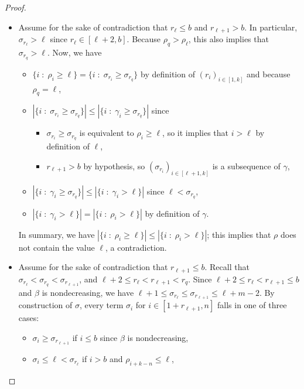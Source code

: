 \documentclass[a4paper,11pt]{article}
\theoremstyle{definition}
\theoremstyle{remark}
\begin{document}
\begin{proof}
    \begin{itemize}
        \item Assume for the sake of contradiction that $r_\ell \leq b$ and $r_{\ell+1} > b$. In particular, $\sigma_{r_{\ell}} > \ell$ since $r_\ell \in [\ell+2, b]$. Because $\rho_q > \rho_\ell$, this also implies that $\sigma_{r_q} > \ell$. Now, we have
        \begin{itemize}
            \item $\{i \; : \; \rho_i \geq \ell \} = \{i \; : \; \sigma_{r_i} \geq \sigma_{r_q}\}$ by definition of $(r_i)_{i \in [1,k]}$ and because $\rho_q = \ell$,
            \item $|\{i \; : \; \sigma_{r_i} \geq \sigma_{r_q}\}| \leq |\{i \; : \; \gamma_i \geq \sigma_{r_q}\}|$ since 
            \begin{itemize}
                \item $\sigma_{r_i} \geq \sigma_{r_q}$ is equivalent to $\rho_i \geq \ell$, so it implies that $i > \ell$ by definition of $\ell$,
                \item $r_{\ell+1} > b$ by hypothesis, so $(\sigma_{r_i})_{i \in [\ell+1,k]}$ is a subsequence of $\gamma$,
            \end{itemize}
            \item $|\{i \; : \; \gamma_i \geq \sigma_{r_q}\}| \leq |\{i \; : \; \gamma_i > \ell\}|$ since $\ell < \sigma_{r_q}$,
            \item $|\{i \; : \; \gamma_i > \ell\}| = |\{i \; : \; \rho_i > \ell\}|$ by definition of $\gamma$.
        \end{itemize}
        In summary, we have $|\{i \; : \; \rho_i \geq \ell \}| \leq |\{i \; : \; \rho_i > \ell\}|$; this implies that $\rho$ does not contain the value $\ell$, a contradiction.
        \item Assume for the sake of contradiction that $r_{\ell+1} \leq b$. Recall that $\sigma_{r_\ell} < \sigma_{r_q} < \sigma_{r_{\ell+1}}$, and $\ell + 2 \leq r_\ell < r_{\ell+1} < r_q$. Since $\ell+2 \leq r_\ell < r_{\ell+1} \leq b$ and $\beta$ is nondecreasing, we have $\ell+1 \leq \sigma_{r_\ell} \leq \sigma_{r_{\ell+1}} \leq \ell + m - 2$. By construction of $\sigma$, every term $\sigma_i$ for $i \in [1+r_{\ell+1}, n]$ falls in one of three cases:
        \begin{itemize}
            \item $\sigma_i \geq \sigma_{r_{\ell+1}}$ if $i \leq b$ since $\beta$ is nondecreasing,
            \item $\sigma_i \leq \ell < \sigma_{r_\ell}$ if $i > b$ and $\rho_{i+k-n} \leq \ell$,

\end{itemize}
\end{itemize}
\end{proof}
\end{document}

